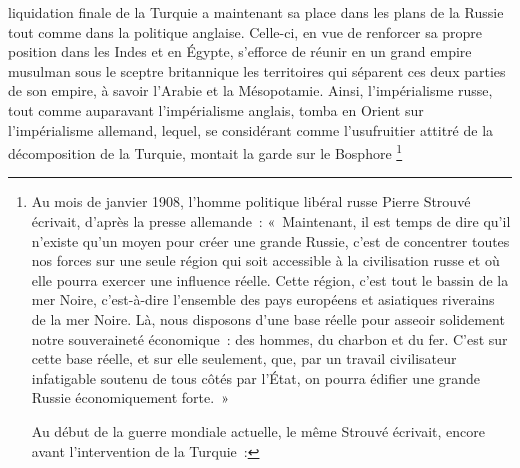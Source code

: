 \documentclass[french,twoside]{book} %
\begin{document}
liquidation finale de la Turquie a maintenant sa place dans les plans de la Russie tout comme dans la politique anglaise. Celle-ci, en vue de renforcer sa propre position dans les Indes et en Égypte, s’efforce de réunir en un grand empire musulman sous le sceptre britannique les territoires qui séparent ces deux parties de son empire, à savoir l’Arabie et la Mésopotamie. Ainsi, l’impérialisme russe, tout comme auparavant l’impérialisme anglais, tomba en Orient sur l’impérialisme allemand, lequel, se considérant comme l’usufruitier attitré de la décomposition de la Turquie, montait la garde sur le Bosphore \footnote{ \noindent Au mois de janvier 1908, l’homme politique libéral russe Pierre Strouvé écrivait, d’après la presse allemande : « Maintenant, il est temps de dire qu’il n’existe qu’un moyen pour créer une grande Russie, c’est de concentrer toutes nos forces sur une seule région qui soit accessible à la civilisation russe et où elle pourra exercer une influence réelle. Cette région, c’est tout le bassin de la mer Noire, c’est-à-dire l’ensemble des pays européens et asiatiques riverains de la mer Noire. Là, nous disposons d’une base réelle pour asseoir solidement notre souveraineté économique : des hommes, du charbon et du fer. C'est sur cette base réelle, et sur elle seulement, que, par un travail civilisateur infatigable soutenu de tous côtés par l’État, on pourra édifier une grande Russie économiquement forte. »\par
 Au début de la guerre mondiale actuelle, le même Strouvé écrivait, encore avant l’intervention de la Turquie :\par
}
\end{document}
